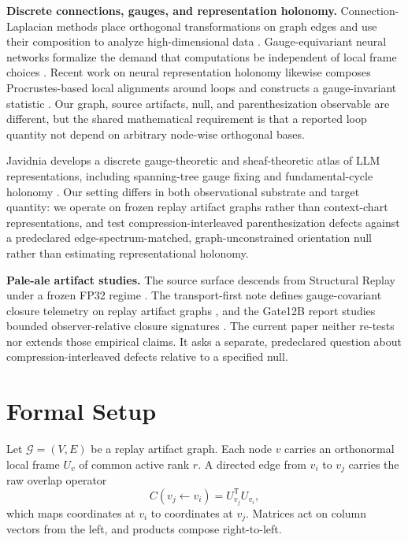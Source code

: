 \documentclass[11pt]{article}
\begin{document}
\textbf{Discrete connections, gauges, and representation holonomy.}
Connection-Laplacian methods place orthogonal transformations on graph edges
and use their composition to analyze high-dimensional data
\cite{singer2012vector}. Gauge-equivariant neural networks formalize the demand
that computations be independent of local frame choices
\cite{cohen2019gauge}. Recent work on neural representation holonomy likewise
composes Procrustes-based local alignments around loops and constructs a
gauge-invariant statistic \cite{sevetlidis2026holonomy}. Our graph, source
artifacts, null, and parenthesization observable are different, but the shared
mathematical requirement is that a reported loop quantity not depend on
arbitrary node-wise orthogonal bases.

Javidnia develops a discrete gauge-theoretic and sheaf-theoretic atlas of LLM
representations, including spanning-tree gauge fixing and fundamental-cycle
holonomy \cite{javidnia2026superposition}. Our setting differs in both
observational substrate and target quantity: we operate on frozen replay
artifact graphs rather than context-chart representations, and test
compression-interleaved parenthesization defects against a predeclared
edge-spectrum-matched, graph-unconstrained orientation null rather than
estimating representational holonomy.

\textbf{Pale-ale artifact studies.}
The source surface descends from Structural Replay under a frozen FP32 regime
\cite{kawasaki2026structural}. The transport-first note defines
gauge-covariant closure telemetry on replay artifact graphs
\cite{kawasaki2026telemetry}, and the Gate12B report studies bounded
observer-relative closure signatures \cite{kawasaki2026observer}. The current
paper neither re-tests nor extends those empirical claims. It asks a separate,
predeclared question about compression-interleaved defects relative to a
specified null.

\section{Formal Setup}
\label{sec:formal-setup}

Let \(\mathcal{G}=(V,E)\) be a replay artifact graph. Each node \(v\) carries
an orthonormal local frame \(U_v\) of common active rank \(r\). A directed edge
from \(v_i\) to \(v_j\) carries the raw overlap operator
\[
C(v_j\leftarrow v_i)=U_{v_j}^{\mathsf T}U_{v_i},
\]
which maps coordinates at \(v_i\) to coordinates at \(v_j\). Matrices act on
column vectors from the left, and products compose right-to-left.
\end{document}
